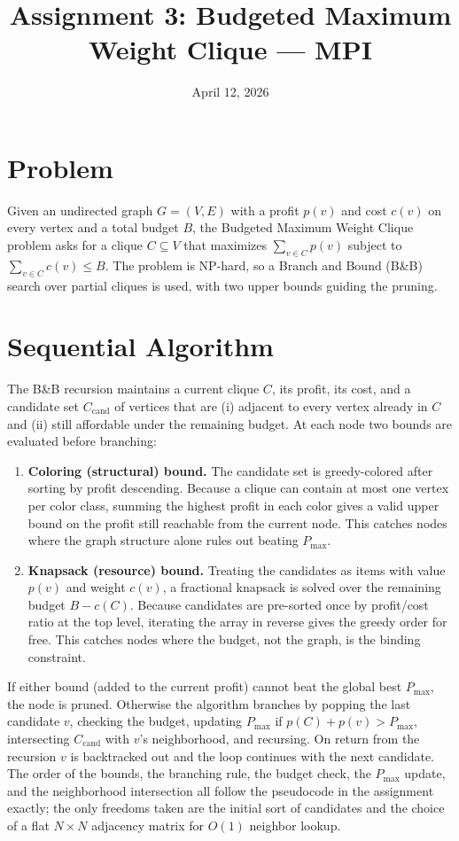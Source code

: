 \documentclass[11pt]{article}
\title{Assignment 3: Budgeted Maximum Weight Clique --- MPI}
\date{April 12, 2026}
\begin{document}
\maketitle

\section{Problem}

Given an undirected graph $G=(V,E)$ with a profit $p(v)$ and cost $c(v)$ on every vertex and a total budget $B$, the Budgeted Maximum Weight Clique problem asks for a clique $C \subseteq V$ that maximizes $\sum_{v \in C} p(v)$ subject to $\sum_{v \in C} c(v) \leq B$. The problem is NP-hard, so a Branch and Bound (B\&B) search over partial cliques is used, with two upper bounds guiding the pruning.

\section{Sequential Algorithm}

The B\&B recursion maintains a current clique $C$, its profit, its cost, and a candidate set $C_{\text{cand}}$ of vertices that are (i) adjacent to every vertex already in $C$ and (ii) still affordable under the remaining budget. At each node two bounds are evaluated before branching:

\begin{enumerate}
    \item \textbf{Coloring (structural) bound.} The candidate set is greedy-colored after sorting by profit descending. Because a clique can contain at most one vertex per color class, summing the highest profit in each color gives a valid upper bound on the profit still reachable from the current node. This catches nodes where the graph structure alone rules out beating $P_{\max}$.
    \item \textbf{Knapsack (resource) bound.} Treating the candidates as items with value $p(v)$ and weight $c(v)$, a fractional knapsack is solved over the remaining budget $B - c(C)$. Because candidates are pre-sorted once by profit/cost ratio at the top level, iterating the array in reverse gives the greedy order for free. This catches nodes where the budget, not the graph, is the binding constraint.
\end{enumerate}

If either bound (added to the current profit) cannot beat the global best $P_{\max}$, the node is pruned. Otherwise the algorithm branches by popping the last candidate $v$, checking the budget, updating $P_{\max}$ if $p(C)+p(v) > P_{\max}$, intersecting $C_{\text{cand}}$ with $v$'s neighborhood, and recursing. On return from the recursion $v$ is backtracked out and the loop continues with the next candidate. The order of the bounds, the branching rule, the budget check, the $P_{\max}$ update, and the neighborhood intersection all follow the pseudocode in the assignment exactly; the only freedoms taken are the initial sort of candidates and the choice of a flat $N \times N$ adjacency matrix for $O(1)$ neighbor lookup.
\end{document}
